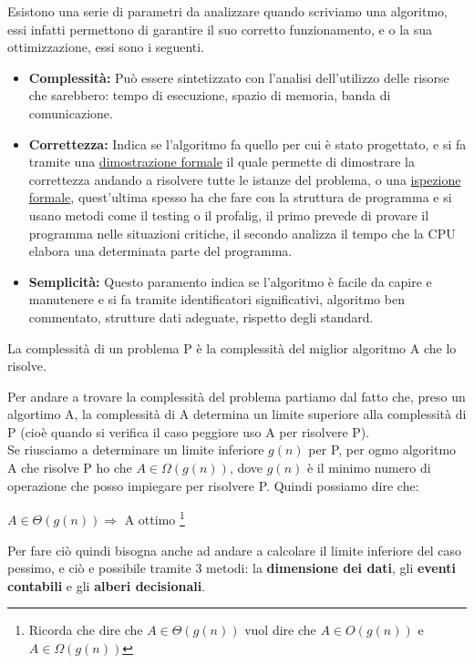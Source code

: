 \hspace{-15pt}Esistono una serie di parametri da analizzare quando scriviamo una algoritmo, essi infatti permettono di garantire il suo corretto funzionamento, e o la sua ottimizzazione, essi sono i seguenti.
\begin{itemize}
    \item \textbf{Complessità:} Può essere sintetizzato con l'analisi dell'utilizzo delle risorse che sarebbero: tempo di esecuzione, spazio di memoria, banda di comunicazione.
    \item \textbf{Correttezza:} Indica se l'algoritmo fa quello per cui è stato progettato, e si fa tramite una \underline{dimostrazione formale} il quale permette di dimostrare la correttezza andando a risolvere tutte le istanze del problema, o una \underline{ispezione formale}, quest'ultima spesso ha che fare con la struttura de programma e si usano metodi come il testing o il profalig, il primo prevede di provare il programma nelle situazioni critiche, il secondo analizza il tempo che la CPU elabora una determinata parte del programma.
    \item \textbf{Semplicità:} Questo paramento indica se l'algoritmo è facile da capire e manutenere e si fa tramite identificatori significativi, algoritmo ben commentato, strutture dati adeguate, rispetto degli standard.
\end{itemize}

\begin{definition}
    La complessità di un problema P è la complessità del miglior algoritmo A che lo risolve.
\end{definition}
Per andare a trovare la complessità del problema partiamo dal fatto che, preso un algortimo A, la complessità di A determina un limite superiore alla complessità di P (cioè quando si verifica il caso peggiore uso A per risolvere P).\\
Se riusciamo a determinare un limite inferiore $g(n)$ per P, per ogmo algoritmo A che risolve P ho che $A \in \Omega(g(n))$, dove $g(n)$ è il minimo numero di operazione che posso impiegare per risolvere P. Quindi possiamo dire che:
\begin{center}
    $A \in \Theta(g(n)) \Longrightarrow$ A ottimo \footnote{Ricorda che dire che $A \in \Theta(g(n))$ vuol dire che $A \in O(g(n))$ e $A \in \Omega(g(n))$}
\end{center}
Per fare ciò quindi bisogna anche ad andare a calcolare il limite inferiore del caso pessimo, e ciò e possibile tramite 3 metodi: la \textbf{dimensione dei dati}, gli \textbf{eventi contabili} e gli \textbf{alberi decisionali}.

